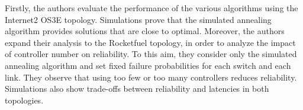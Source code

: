 \documentclass[a4paper,10pt]{article}
\begin{document}
Firstly, the authors evaluate the performance of the various algorithms using the Internet2 OS3E topology. Simulations prove that the simulated annealing algorithm provides solutions that are close to optimal. Moreover, the authors expand their analysis to the Rocketfuel topology, in order to analyze the impact of controller number on reliability. To this aim, they consider only the simulated annealing algorithm and set fixed failure probabilities for each switch and each link. They observe that using too few or too many controllers reduces reliability. Simulations also show trade-offs between reliability and latencies in both topologies.




\end{document}
